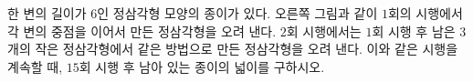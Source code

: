 \noindent\begin{minipage}[t]{0.58\linewidth}\vspace{0pt}\raggedright 한 변의 길이가 $6$인 정삼각형 모양의 종이가 있다. 오른쪽 그림과 같이 $1$회의 시행에서 각 변의 중점을 이어서 만든 정삼각형을 오려 낸다. $2$회 시행에서는 $1$회 시행 후 남은 $3$개의 작은 정삼각형에서 같은 방법으로 만든 정삼각형을 오려 낸다. 이와 같은 시행을 계속할 때, $15$회 시행 후 남아 있는 종이의 넓이를 구하시오.\end{minipage}\hfill\begin{minipage}[t]{0.4\linewidth}\vspace{0pt}\centering \resizebox{\ifdim\width>\linewidth\linewidth\else\width\fi}{!}{}\end{minipage}\par
